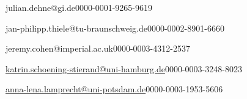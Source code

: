 


\author[1]{Julian Dehne}{julian.dehne@gi.de}{0000-0001-9265-9619}
\author[2]{Jan Philipp Thiele}{jan-philipp.thiele@tu-braunschweig.de}{0000-0002-8901-6660}
\author[3]{Jeremy Cohen}{jeremy.cohen@imperial.ac.uk}{0000-0003-4312-2537}
\author[4]{Katrin Schöning-Stierand}{\href{mailto:katrin.schoening-stierand@uni-hamburg.de}{katrin.schoening-stierand@uni-hamburg.de}}{0000-0003-3248-8023}
\author[5]{Anna-Lena Lamprecht}{\href{mailto:anna-lena.lamprecht@uni-potsdam.de}{anna-lena.lamprecht@uni-potsdam.de}}{0000-0003-1953-5606}

